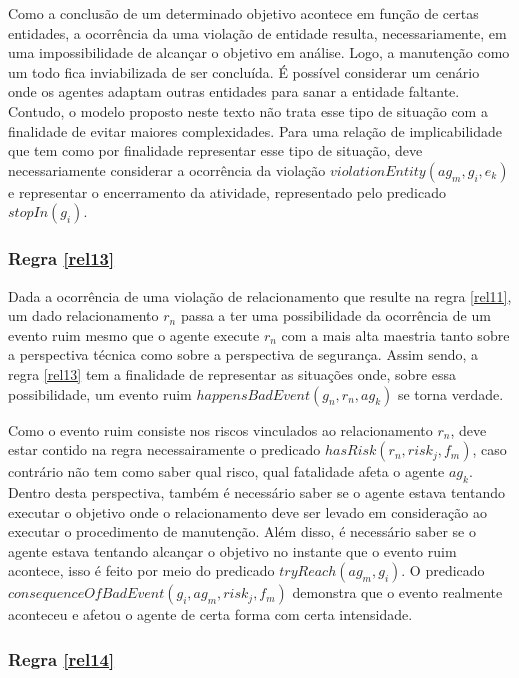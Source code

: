 \documentclass[12pt]{article}
\begin{document}
Como a conclusão de um determinado objetivo acontece em função de certas entidades, a ocorrência da uma violação de entidade resulta, necessariamente, em uma impossibilidade de alcançar o objetivo em análise. Logo, a manutenção como um todo fica inviabilizada de ser concluída. É possível considerar um cenário onde os agentes adaptam outras entidades para sanar a entidade faltante. Contudo, o modelo proposto neste texto não trata esse tipo de situação com a finalidade de evitar maiores complexidades. Para uma relação de implicabilidade que tem como por finalidade representar esse tipo de situação, deve necessariamente considerar a ocorrência da violação $violationEntity(ag_m,g_i,e_k)$ e representar o encerramento da atividade, representado pelo predicado $stopIn(g_i)$.

\subsubsection{Regra \ref{rel13}}

Dada a ocorrência de uma violação de relacionamento que resulte na regra \ref{rel11}, um dado relacionamento  $r_n$ passa a ter uma possibilidade da ocorrência de um evento ruim mesmo que o agente execute $r_n$ com a mais alta maestria tanto sobre a perspectiva técnica como sobre a perspectiva de segurança. Assim sendo, a regra \ref{rel13} tem a finalidade de representar as situações onde, sobre essa possibilidade, um evento ruim $happensBadEvent(g_n,r_n,ag_k)$ se torna verdade. 

Como o evento ruim consiste nos riscos vinculados ao relacionamento $r_n$, deve estar contido na regra necessairamente o predicado $hasRisk(r_n,risk_j,f_m)$, caso contrário não tem como saber qual risco, qual fatalidade afeta o agente $ag_k$. Dentro desta perspectiva, também é necessário saber se o agente estava tentando executar o objetivo onde o relacionamento deve ser levado em consideração ao executar o procedimento de manutenção. Além disso, é necessário saber se o agente estava tentando alcançar o objetivo no instante que o evento ruim acontece, isso é feito por meio do predicado $tryReach(ag_m,g_i)$. O predicado $consequenceOfBadEvent(g_i,ag_m,risk_j,f_m)$ demonstra que o evento realmente aconteceu e afetou o agente de certa forma com certa intensidade.

\subsubsection{Regra \ref{rel14}}
\end{document}
